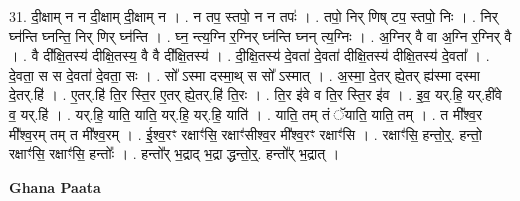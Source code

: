\documentclass[17pt]{extarticle}
\begin{document}
31. दी॒क्षाम् न न दी॒क्षाम् दी॒क्षाम् न । . न तप॒ स्तपो॒ न न तपः॑ । . तपो॒ निर् णिष् टप॒ स्तपो॒ निः । . निर् घ्न॑न्ति घ्नन्ति॒ निर् णिर् घ्न॑न्ति । . घ्न॒ न्त्य॒ग्नि र॒ग्निर् घ्न॑न्ति घ्नन् त्य॒ग्निः । . अ॒ग्निर् वै वा अ॒ग्नि र॒ग्निर् वै । . वै दी᳚क्षि॒तस्य॑ दीक्षि॒तस्य॒ वै वै दी᳚क्षि॒तस्य॑ । . दी॒क्षि॒तस्य॑ दे॒वता॑ दे॒वता॑ दीक्षि॒तस्य॑ दीक्षि॒तस्य॑ दे॒वता᳚ । . दे॒वता॒ स स दे॒वता॑ दे॒वता॒ सः । . सो᳚ ऽस्मा दस्मा॒थ् स सो᳚ ऽस्मात् । . अ॒स्मा॒ दे॒तर् ह्ये॒तर् ह्य॑स्मा दस्मा दे॒तर्.हि॑ । . ए॒तर्.हि॑ ति॒र स्ति॒र ए॒तर् ह्ये॒तर्.हि॑ ति॒रः । . ति॒र इ॑वे व ति॒र स्ति॒र इ॑व । . इ॒व॒ यर्.हि॒ यर्.ही॑वे व॒ यर्.हि॑ । . यर्.हि॒ याति॒ याति॒ यर्.हि॒ यर्.हि॒ याति॑ । . याति॒ तम् तं ॅयाति॒ याति॒ तम् । . त मी᳚श्व॒र मी᳚श्व॒रम् तम् त मी᳚श्व॒रम् । . ई॒श्व॒रꣳ रक्षाꣳ॑सि॒ रक्षाꣳ॑सीश्व॒र मी᳚श्व॒रꣳ रक्षाꣳ॑सि । . रक्षाꣳ॑सि॒ हन्तो॒र्॒. हन्तो॒ रक्षाꣳ॑सि॒ रक्षाꣳ॑सि॒ हन्तोः᳚ । . हन्तो᳚र् भ॒द्राद् भ॒द्रा द्धन्तो॒र्॒. हन्तो᳚र् भ॒द्रात् । \newline

\textbf{Ghana Paata } \newline
\end{document}
